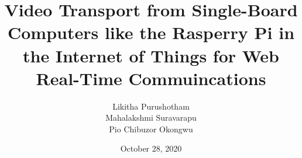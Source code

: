 \author{Likitha Purushotham \\ Mahalakshmi Suravarapu \\ Pio Chibuzor Okongwu}
\title{Video Transport from Single-Board Computers like the Rasperry Pi in the Internet of Things for Web Real-Time Commuincations}
\date{October 28, 2020}

\newlanguagecommand{\semester}

\newcommand{\supervisor}{Prof. Dr. Udo Krieger \& Marcel Großmann}

\gitfalse
